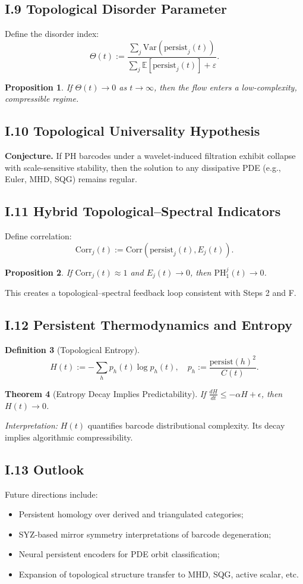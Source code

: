 \documentclass[11pt]{article}
\newtheorem{theorem}{Theorem}[section]
\newtheorem{proposition}[theorem]{Proposition}
\theoremstyle{definition}
\newtheorem{definition}[theorem]{Definition}
\begin{document}
\subsection*{I.9 Topological Disorder Parameter}
Define the disorder index:
\[
\Theta(t) := \frac{\sum_j \mathrm{Var}(\mathrm{persist}_j(t))}{\sum_j \mathbb{E}[\mathrm{persist}_j(t)] + \varepsilon}.
\]
\begin{proposition}
If $\Theta(t) \to 0$ as $t \to \infty$, then the flow enters a low-complexity, compressible regime.
\end{proposition}

\subsection*{I.10 Topological Universality Hypothesis}
\textbf{Conjecture.} If PH barcodes under a wavelet-induced filtration exhibit collapse with scale-sensitive stability, then the solution to any dissipative PDE (e.g., Euler, MHD, SQG) remains regular.

\subsection*{I.11 Hybrid Topological--Spectral Indicators}
Define correlation:
\[
\mathrm{Corr}_j(t) := \mathrm{Corr}(\mathrm{persist}_j(t), E_j(t)).
\]
\begin{proposition}
If $\mathrm{Corr}_j(t) \approx 1$ and $E_j(t) \to 0$, then $\mathrm{PH}_1^j(t) \to 0$.
\end{proposition}
This creates a topological–spectral feedback loop consistent with Steps 2 and F.

\subsection*{I.12 Persistent Thermodynamics and Entropy}
\begin{definition}[Topological Entropy]
\[
H(t) := - \sum_h p_h(t) \log p_h(t), \quad p_h := \frac{\mathrm{persist}(h)^2}{C(t)}.
\]
\end{definition}
\begin{theorem}[Entropy Decay Implies Predictability]
If $\frac{dH}{dt} \leq -\alpha H + \epsilon$, then $H(t) \to 0$.
\end{theorem}
\textit{Interpretation:} $H(t)$ quantifies barcode distributional complexity. Its decay implies algorithmic compressibility.

\subsection*{I.13 Outlook}
Future directions include:
\begin{itemize}
  \item Persistent homology over derived and triangulated categories;
  \item SYZ-based mirror symmetry interpretations of barcode degeneration;
  \item Neural persistent encoders for PDE orbit classification;
  \item Expansion of topological structure transfer to MHD, SQG, active scalar, etc.
\end{itemize}
\end{document}
